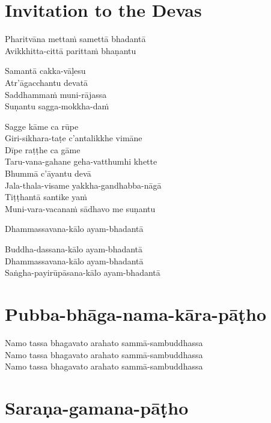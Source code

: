\chapter{Invitation to the Devas}


\begin{paritta}
%
Pharitvāna mettaṁ samettā bhadantā\\
Avikkhitta-cittā parittaṁ bhaṇantu

%
Samantā cakka-vāḷesu\\
Atr'āgacchantu devatā\\
Saddhammaṁ muni-rājassa\\
Suṇantu sagga-mokkha-daṁ

Sagge kāme ca rūpe\\
Giri-sikhara-taṭe c'antalikkhe vimāne\\
Dīpe raṭṭhe ca gāme\\
Taru-vana-gahane geha-vatthumhi khette\\
Bhummā c'āyantu devā\\
Jala-thala-visame yakkha-gandhabba-nāgā\\
Tiṭṭhantā santike yaṁ\\
Muni-vara-vacanaṁ sādhavo me suṇantu

Dhammassavana-kālo ayam-bhadantā


Buddha-dassana-kālo ayam-bhadantā\\
Dhammassavana-kālo ayam-bhadantā\\
Saṅgha-payirūpāsana-kālo ayam-bhadantā
\end{paritta}

\clearpage

\chapter{Pubba-bhāga-nama-kāra-pāṭho}


\begin{paritta}
Namo tassa bhagavato arahato sammā-sambuddhassa\\
Namo tassa bhagavato arahato sammā-sambuddhassa\\
Namo tassa bhagavato arahato sammā-sambuddhassa
\end{paritta}

\chapter{Saraṇa-gamana-pāṭho}

